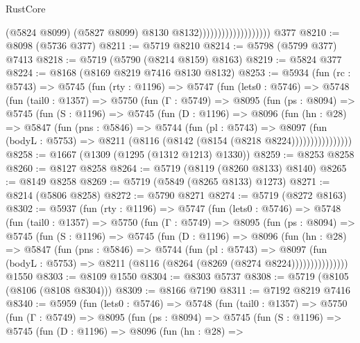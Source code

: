 \begin{lexlean}{RustCore}
\begin{coremodule}
{\begin{coremodule}
{{{{{{{{{{{{{{{{{{{{{{{{{{{{{{{{{{{{{{{{{{{{                                          (@5824 @8099)
                                          (@5827 @8099)
                                          @8130
                                          @8132)))))))))))))))))))
    @377
@8210 := @8098 (@5736 @377)
@8211 := @5719 @8210
@8214 := @5798 (@5799 @377) @7413
@8218 := @5719 (@5790 (@8214 @8159) @8163)
@8219 := @5824 @377
@8224 := @8168 (@8169 @8219 @7416 @8130 @8132)
@8253 := @5934
    (fun (rc : @5743) =>
    @5745
      (fun (rty : @1196) =>
      @5747
        (fun (lets0 : @5746) =>
        @5748
          (fun (tail0 : @1357) =>
          @5750
            (fun (Γ : @5749) =>
            @8095
              (fun (ps : @8094) =>
              @5745
                (fun (S : @1196) =>
                @5745
                  (fun (D : @1196) =>
                  @8096
                    (fun (hn : @28) =>
                    @5847
                      (fun (pns : @5846) =>
                      @5744
                        (fun (pl : @5743) =>
                        @8097
                          (fun (bodyL : @5753) =>
                          @8211 (@8116 (@8142 (@8154 (@8218 @8224))))))))))))))))
@8258 := @1667 (@1309 (@1295 (@1312 @1213) @1330))
@8259 := @8253 @8258
@8260 := @8127 @8258
@8264 := @5719 (@8119 (@8260 @8133) @8140)
@8265 := @8149 @8258
@8269 := @5719 (@5849 (@8265 @8133) @1273)
@8271 := @8214 (@5806 @8258)
@8272 := @5790 @8271
@8274 := @5719 (@8272 @8163)
@8302 := @5937
    (fun (rty : @1196) =>
    @5747
      (fun (lets0 : @5746) =>
      @5748
        (fun (tail0 : @1357) =>
        @5750
          (fun (Γ : @5749) =>
          @8095
            (fun (ps : @8094) =>
            @5745
              (fun (S : @1196) =>
              @5745
                (fun (D : @1196) =>
                @8096
                  (fun (hn : @28) =>
                  @5847
                    (fun (pns : @5846) =>
                    @5744
                      (fun (pl : @5743) =>
                      @8097
                        (fun (bodyL : @5753) =>
                        @8211 (@8116 (@8264 (@8269 (@8274 @8224)))))))))))))))
    @1550
@8303 := @8109 @1550
@8304 := @8303 @5737
@8308 := @5719 (@8105 (@8106 (@8108 @8304)))
@8309 := @8166 @7190
@8311 := @7192 @8219 @7416
@8340 := @5959
    (fun (lets0 : @5746) =>
    @5748
      (fun (tail0 : @1357) =>
      @5750
        (fun (Γ : @5749) =>
        @8095
          (fun (ps : @8094) =>
          @5745
            (fun (S : @1196) =>
            @5745
              (fun (D : @1196) =>
              @8096
                (fun (hn : @28) =>
}}}}}}}}}}}}}}}}}}}}}}}}}}}}}}}}}}}}}}}}}}}}
\end{coremodule}}
\end{coremodule}
\end{lexlean}
